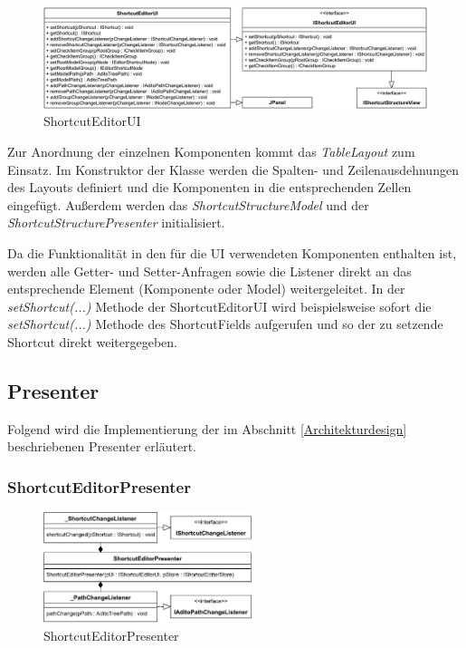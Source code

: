 \begin{figure}[H]
	\centering
	\includegraphics[width=1\linewidth]{../graphic/diagrams/CD_ShortcutEditorUI/ShortcutEditorUI}
	\caption{ShortcutEditorUI}
	\label{fig:shortcuteditorui}
\end{figure}

Zur Anordnung der einzelnen Komponenten kommt das \emph{TableLayout} zum Einsatz. Im Konstruktor der Klasse werden die Spalten- und Zeilenausdehnungen des Layouts definiert und die Komponenten in die entsprechenden Zellen eingefügt. Außerdem werden das \emph{ShortcutStructureModel} und der \emph{ShortcutStructurePresenter} initialisiert. 

Da die Funktionalität in den für die UI verwendeten Komponenten enthalten ist, werden alle Getter- und Setter-Anfragen sowie die Listener direkt an das entsprechende Element (Komponente oder Model) weitergeleitet. In der \emph{setShortcut(...)} Methode der ShortcutEditorUI wird beispielsweise sofort die \emph{setShortcut(...)} Methode des ShortcutFields aufgerufen und so der zu setzende Shortcut direkt weitergegeben.

\newpage

\subsection{Presenter}

Folgend wird die Implementierung der im Abschnitt \ref{Architekturdesign} beschriebenen Presenter erläutert.

\subsubsection{ShortcutEditorPresenter}

\begin{figure}
	\vspace{-12px}
	\centering
	\includegraphics[width=230px]{../graphic/diagrams/CD_ShortcutEditorPresenter/ShortcutEditorPresenter}
	\caption{ShortcutEditorPresenter}
	\label{fig:shortcuteditorpresenter}
\end{figure}

